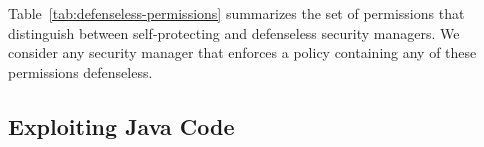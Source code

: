 \documentclass{sig-alternate}
\begin{document}
Table~\ref{tab:defenseless-permissions} summarizes the set of permissions
that distinguish between self-protecting and defenseless security
managers. We consider any security manager that enforces a policy
containing any of these permissions defenseless.

\subsection{Exploiting Java Code}
\label{sec:javaexploits}

\end{document}
